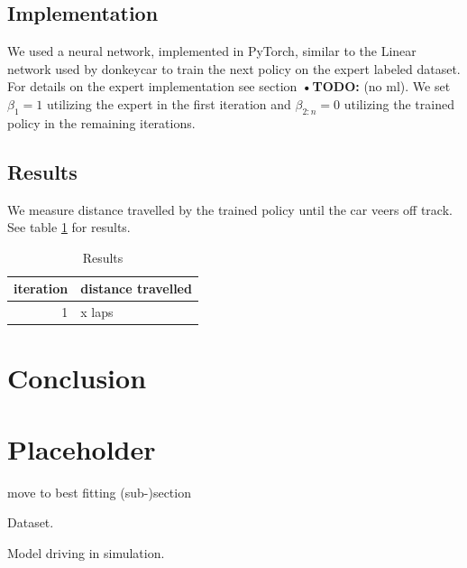 \documentclass[conference]{IEEEtran}
\begin{document}
\subsection{Implementation}
We used a neural network, implemented in PyTorch, similar to the Linear network used by donkeycar to train the next policy on the expert labeled dataset. For details on the expert implementation see section \textbf{•TODO:} (no ml). We set \( \beta_1 = 1 \) utilizing the expert in the first iteration and \( \beta_{2:n} = 0 \) utilizing the trained policy in the remaining iterations.

\subsection{Results}
We measure distance travelled by the trained policy until the car veers off track. See table \ref{tab:results} for results.

\begin{table}[!t]
\renewcommand{\arraystretch}{1.3}
\caption{Results}
\centering
\begin{tabular}{r|l}
iteration&distance travelled\\
\hline
1&x laps\\
\end{tabular}
\label{tab:results}
\end{table}

\section{Conclusion}

\section{Placeholder}

move to best fitting (sub-)section

\begin{video}[!t]
	\caption{Dataset.}
	\label{vid:dataset}
\end{video}

\begin{video}[!t]
	\caption{Model driving in simulation.}
	\label{vid:model}
\end{video}
\end{document}
